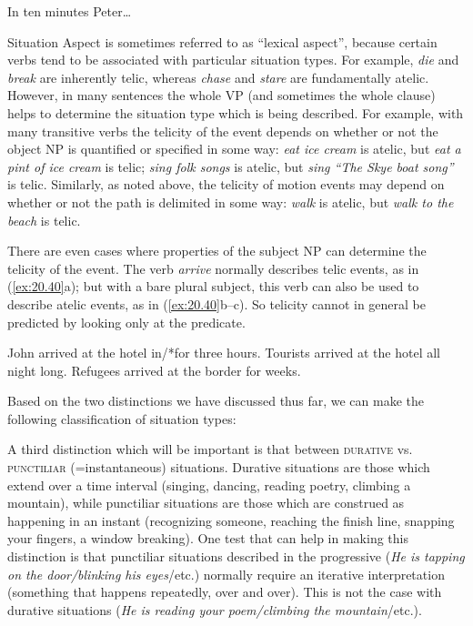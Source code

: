 \ea \label{ex:20.7}
In ten minutes Peter…\\
                       \z
\z


Situation Aspect is sometimes referred to as “lexical aspect”, because certain verbs tend to be associated with particular situation types. For example, \textit{die} and \textit{break} are inherently telic, whereas \textit{chase} and \textit{stare} are fundamentally atelic. However, in many sentences the whole VP (and sometimes the whole clause) helps to determine the situation type which is being described. For example, with many transitive verbs the telicity of the event depends on whether or not the object NP is quantified or specified in some way: \textit{eat ice cream} is atelic, but \textit{eat a pint of ice cream} is telic; \textit{sing folk songs} is atelic, but \textit{sing “The Skye boat song”} is telic. Similarly, as noted above, the telicity of motion events may depend on whether or not the path is delimited in some way: \textit{walk} is atelic, but \textit{walk to the beach} is telic.

There are even cases where properties of the subject NP can determine the telicity of the event. The verb \textit{arrive} normally describes telic events, as in (\ref{ex:20.40}a); but with a bare plural subject, this verb can also be used to describe atelic events, as in (\ref{ex:20.40}b--c). So telicity cannot in general be predicted by looking only at the predicate. 

\ea \label{ex:20.40}
\ea John arrived at the hotel in/*for three hours.
\ex Tourists arrived at the hotel all night long.
\ex Refugees arrived at the border for weeks.
                       \z
\z


Based on the two distinctions we have discussed thus far, we can make the following classification of situation types:




A third distinction which will be important is that between \textsc{durative} vs. \textsc{punctiliar} (=instantaneous) situations. Durative situations are those which extend over a time interval (singing, dancing, reading poetry, climbing a mountain), while punctiliar situations are those which are construed as happening in an instant (recognizing someone, reaching the finish line, snapping your fingers, a window breaking). One test that can help in making this distinction is that punctiliar situations described in the progressive (\textit{He is tapping on the door/blinking his eyes}/etc.) normally require an iterative interpretation (something that happens repeatedly, over and over). This is not the case with durative situations (\textit{He is reading your poem/climbing the mountain}/etc.).



